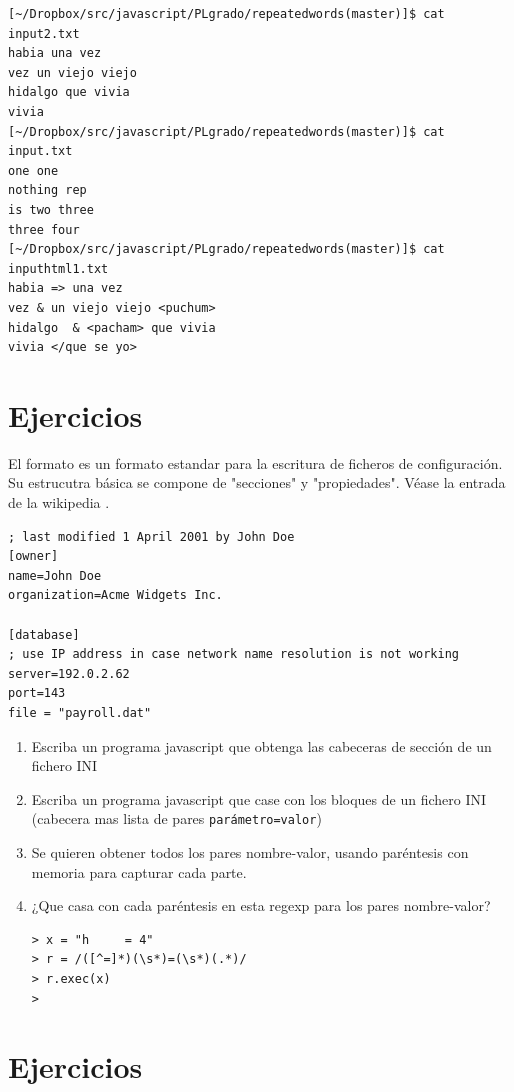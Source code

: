 \begin{verbatim}
[~/Dropbox/src/javascript/PLgrado/repeatedwords(master)]$ cat input2.txt 
habia una vez 
vez un viejo viejo
hidalgo que vivia 
vivia
[~/Dropbox/src/javascript/PLgrado/repeatedwords(master)]$ cat input.txt 
one one
nothing rep
is two three
three four
[~/Dropbox/src/javascript/PLgrado/repeatedwords(master)]$ cat inputhtml1.txt 
habia => una vez 
vez & un viejo viejo <puchum>
hidalgo  & <pacham> que vivia 
vivia </que se yo>

\end{verbatim}

\section{Ejercicios}
El formato   es un formato estandar 
para la escritura de ficheros de configuración. 
Su estrucutra básica se compone de
"secciones" y "propiedades". Véase la entrada de la wikipedia
.
\begin{verbatim}
; last modified 1 April 2001 by John Doe
[owner]
name=John Doe
organization=Acme Widgets Inc.
 
[database]
; use IP address in case network name resolution is not working
server=192.0.2.62     
port=143
file = "payroll.dat"
\end{verbatim}
\begin{enumerate}
\item 
Escriba un programa javascript que obtenga las cabeceras de sección de un fichero 
INI
\item 
Escriba un programa javascript que case con los bloques de un fichero INI (cabecera mas lista de pares \verb|parámetro=valor|)

\item 
Se quieren obtener todos los pares nombre-valor, usando paréntesis con memoria para capturar cada parte.

\item  ¿Que casa con cada paréntesis en esta regexp para los  pares nombre-valor?
\begin{verbatim}
> x = "h     = 4"
> r = /([^=]*)(\s*)=(\s*)(.*)/
> r.exec(x)
>
\end{verbatim}
\end{enumerate}

\section{Ejercicios}

